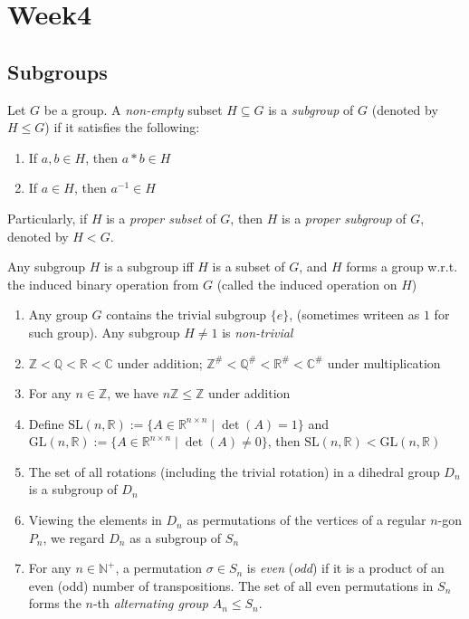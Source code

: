
\chapter{Week4}

\section{Subgroups}
\begin{definition}
Let $G$ be a group. A \emph{non-empty} subset $H\subseteq G$ is a \emph{subgroup} of $G$ (denoted by $H\le G$) if it satisfies the following:
\begin{enumerate}
\item
If $a,b\in H$, then $a*b\in H$
\item
If $a\in H$, then $a^{-1}\in H$
\end{enumerate}
Particularly, if $H$ is a \emph{proper subset} of $G$, then $H$ is a \emph{proper subgroup} of $G$, denoted by $H<G$.
\end{definition}
\begin{remark}
Any subgroup $H$ is a subgroup iff $H$ is a subset of $G$, and $H$ forms a group w.r.t. the induced binary operation from $G$ (called the induced operation on $H$)
\end{remark}
\begin{example}
\begin{enumerate}
\item
Any group $G$ contains the trivial subgroup $\{e\}$, (sometimes writeen as $1$ for such group). Any subgroup $H\ne 1$ is \emph{non-trivial}
\item
$\mathbb{Z}<\mathbb{Q}<\mathbb{R}<\mathbb{C}$ under addition; $\mathbb{Z}^{\#}<\mathbb{Q}^{\#}<\mathbb{R}^{\#}<\mathbb{C}^{\#}$ under multiplication
\item
For any $n\in\mathbb{Z}$, we have $n\mathbb{Z}\le\mathbb{Z}$ under addition
\item
Define $\mbox{SL}(n,\mathbb{R}):=\{A\in\mathbb{R}^{n\times n}\mid \det(A)=1\}$ and $\mbox{GL}(n,\mathbb{R}):=\{A\in\mathbb{R}^{n\times n}\mid \det(A)\ne0\}$, then $\mbox{SL}(n,\mathbb{R})<\mbox{GL}(n,\mathbb{R})$
\item
The set of all rotations (including the trivial rotation) in a dihedral group $D_n$ is a subgroup of $D_n$
\item
Viewing the elements in $D_n$ as permutations of the vertices of a regular $n$-gon $P_n$, we regard $D_n$ as a subgroup of $S_n$
\item
For any $n\in\mathbb{N}^+$, a permutation $\sigma\in S_n$ is \emph{even} (\emph{odd}) if it is a product of an even (odd) number of transpositions. The set of all even permutations in $S_n$ forms the $n$-th \emph{alternating group} $A_n\le S_n$.
\end{enumerate}
\end{example}

